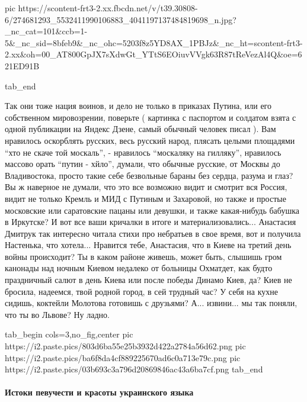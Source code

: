      pic https://scontent-frt3-2.xx.fbcdn.net/v/t39.30808-6/274681293_5532411990106883_4041197137484819698_n.jpg?_nc_cat=101&ccb=1-5&_nc_sid=8bfeb9&_nc_ohc=5203f8z5YD8AX_1PBJz&_nc_ht=scontent-frt3-2.xx&oh=00_AT800GpJX7sXdwGt_YTtS6EOiuvVVgk63R87tReVezAl4Q&oe=621ED91B

  tab_end
\fi

Так они тоже нация воинов, и дело не только в приказах Путина, или его
собственном мировозрении, поверьте ( картинка с паспортом и солдатом взята с
одной публикации на Яндекс Дзене, самый обычный человек писал ). Вам нравилось
оскорблять русских, весь русский народ, плясать целыми площадями \enquote{хто
не скаче той москаль}, - нравилось \enquote{москаляку на гилляку}, нравилось
массово орать \enquote{путин - хйло}, думали, что обычные русские, от Москвы до
Владивостока, просто такие себе безвольные бараны без сердца, разума и глаз? Вы
ж наверное не думали, что это все возможно видит и смотрит вся Россия, видит не
только Кремль и МИД с Путиным и Захаровой, но также и простые московские или
саратовские пацаны или девушки, и также какая-нибудь бабушка в Иркутске? И вот
все ваши кричалки в итоге и материализовались... Анастасия Дмитрук так
интересно читала стихи про небратьев в свое время, вот и получила Настенька,
что хотела... Нравится тебе, Анастасия, что в Киеве на третий день войны
происходит? Ты в каком районе живешь, может быть, слышишь гром канонады над
ночным Киевом недалеко от больницы Охматдет, как будто праздничный салют в день
Киева или после победы Динамо Киев, да? Киев не бросила, надеемся, твой родной
город, в сей трудный час? У себя на кухне сидишь, коктейли Молотова готовишь с
друзьями? А... извини... мы так поняли, что ты во Львове? Ну ладно.

\ifcmt
  tab_begin cols=3,no_fig,center
     pic https://i2.paste.pics/803d6ba55e25b3932d422a2784a56d62.png
     pic https://i2.paste.pics/ba6f8da4cf889225670ad6c0a713e79c.png
     pic https://i2.paste.pics/03b693c3a796d20869846ac43a6ba7cf.png
  tab_end
\fi

\paragraph{Истоки певучести и красоты украинского языка}

